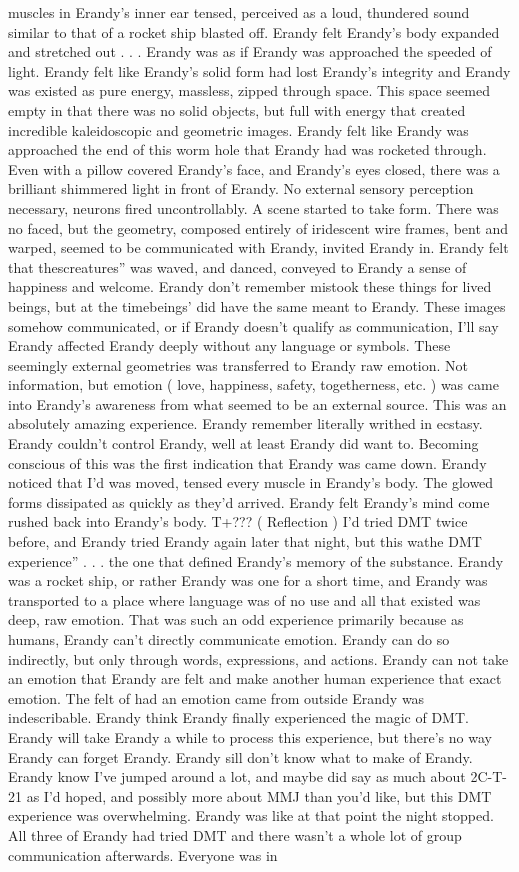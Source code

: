 \documentclass[12pt]{book}
\begin{document}
muscles in Erandy's inner ear tensed, perceived as a loud, thundered sound similar to that of a rocket ship blasted off. Erandy felt Erandy's body expanded and stretched out  . . .  Erandy was as if Erandy was approached the speeded of light. Erandy felt like Erandy's solid form had lost Erandy's integrity and Erandy was existed as pure energy, massless, zipped through space. This space seemed empty in that there was no solid objects, but full with energy that created incredible kaleidoscopic and geometric images. Erandy felt like Erandy was approached the end of this worm hole that Erandy had was rocketed through. Even with a pillow covered Erandy's face, and Erandy's eyes closed, there was a brilliant shimmered light in front of Erandy. No external sensory perception necessary, neurons fired uncontrollably. A scene started to take form. There was no faced, but the geometry, composed entirely of iridescent wire frames, bent and warped, seemed to be communicated with Erandy, invited Erandy in. Erandy felt that thescreatures'' was waved, and danced, conveyed to Erandy a sense of happiness and welcome. Erandy don't remember mistook these things for lived beings, but at the timebeings' did have the same meant to Erandy. These images somehow communicated, or if Erandy doesn't qualify as communication, I'll say Erandy affected Erandy deeply without any language or symbols. These seemingly external geometries was transferred to Erandy raw emotion. Not information, but emotion ( love, happiness, safety, togetherness, etc. ) was came into Erandy's awareness from what seemed to be an external source. This was an absolutely amazing experience. Erandy remember literally writhed in ecstasy. Erandy couldn't control Erandy, well at least Erandy did want to. Becoming conscious of this was the first indication that Erandy was came down. Erandy noticed that I'd was moved, tensed every muscle in Erandy's body. The glowed forms dissipated as quickly as they'd arrived. Erandy felt Erandy's mind come rushed back into Erandy's body. T+??? ( Reflection ) I'd tried DMT twice before, and Erandy tried Erandy again later that night, but this wathe DMT experience''  . . .  the one that defined Erandy's memory of the substance. Erandy was a rocket ship, or rather Erandy was one for a short time, and Erandy was transported to a place where language was of no use and all that existed was deep, raw emotion. That was such an odd experience primarily because as humans, Erandy can't directly communicate emotion. Erandy can do so indirectly, but only through words, expressions, and actions. Erandy can not take an emotion that Erandy are felt and make another human experience that exact emotion. The felt of had an emotion came from outside Erandy was indescribable. Erandy think Erandy finally experienced the magic of DMT. Erandy will take Erandy a while to process this experience, but there's no way Erandy can forget Erandy. Erandy sill don't know what to make of Erandy. Erandy know I've jumped around a lot, and maybe did say as much about 2C-T-21 as I'd hoped, and possibly more about MMJ than you'd like, but this DMT experience was overwhelming. Erandy was like at that point the night stopped. All three of Erandy had tried DMT and there wasn't a whole lot of group communication afterwards. Everyone was in 
\end{document}
